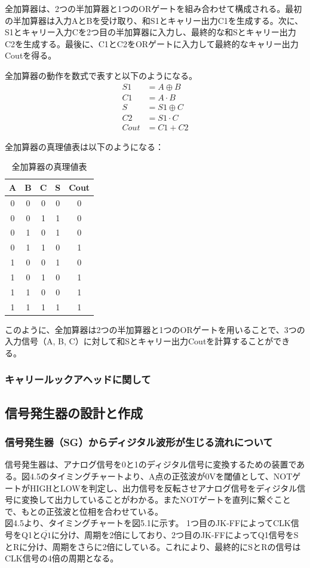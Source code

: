 \documentclass{jlreq}
\numberwithin{equation}{section}
\begin{document}
全加算器は、2つの半加算器と1つのORゲートを組み合わせて構成される。最初の半加算器は入力AとBを受け取り、和S1とキャリー出力C1を生成する。次に、S1とキャリー入力Cを2つ目の半加算器に入力し、最終的な和Sとキャリー出力C2を生成する。最後に、C1とC2をORゲートに入力して最終的なキャリー出力Coutを得る。

全加算器の動作を数式で表すと以下のようになる。
\begin{align}
  S1 &= A \oplus B \\
  C1 &= A \cdot B \\
  S &= S1 \oplus C \\
  C2 &= S1 \cdot C \\
  Cout &= C1 + C2
\end{align}

全加算器の真理値表は以下のようになる：
\begin{table}[H]
  \centering
  \caption{全加算器の真理値表}
  \begin{tabular}{|c|c|c|c|c|}
    \hline
    A & B & C & S & Cout \\ \hline
    0 & 0 & 0 & 0 & 0 \\ \hline
    0 & 0 & 1 & 1 & 0 \\ \hline
    0 & 1 & 0 & 1 & 0 \\ \hline
    0 & 1 & 1 & 0 & 1 \\ \hline
    1 & 0 & 0 & 1 & 0 \\ \hline
    1 & 0 & 1 & 0 & 1 \\ \hline
    1 & 1 & 0 & 0 & 1 \\ \hline
    1 & 1 & 1 & 1 & 1 \\ \hline
  \end{tabular}
\end{table}

このように、全加算器は2つの半加算器と1つのORゲートを用いることで、3つの入力信号（A, B, C）に対して和Sとキャリー出力Coutを計算することができる。

\subsubsection{キャリールックアヘッドに関して}

\subsection{信号発生器の設計と作成}
\subsubsection{信号発生器（SG）からディジタル波形が生じる流れについて}
信号発生器は、アナログ信号を0と1のディジタル信号に変換するための装置である。図4.5のタイミングチャートより、A点の正弦波が0Vを閾値として、NOTゲートがHIGHとLOWを判定し、出力信号を反転させアナログ信号をディジタル信号に変換して出力していることがわかる。またNOTゲートを直列に繋ぐことで、もとの正弦波と位相を合わせている。\\
図4.5より、タイミングチャートを図5.1に示す。
1つ目のJK-FFによってCLK信号をQ1と\(\overline{Q1}\)に分け、周期を2倍にしており、2つ目のJK-FFによってQ1信号をSとRに分け、周期をさらに2倍にしている。これにより、最終的にSとRの信号はCLK信号の4倍の周期となる。
\end{document}
